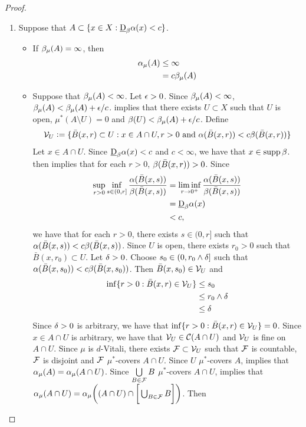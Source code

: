 \documentclass{book}
\begin{document}
	\begin{proof}\
		\begin{enumerate}
			\item Suppose that $A \subset \{x \in X: \underbar{D}_{\beta}\alpha(x) < c\}$. 
			\begin{itemize}
				\item If $\beta_{\mu}(A) = \infty$, then 
				\begin{align*}
					\alpha_{\mu}(A)
					&  \leq \infty \\
					& = c \beta_{\mu}(A)
				\end{align*}
				\item Suppose that $\beta_{\mu}(A) < \infty$. Let $\epsilon >0$. Since $\beta_{\mu}(A) < \infty$, $\beta_{\mu}(A) < \beta_{\mu}(A) + \epsilon/c$.  implies that there exists $U \subset X$ such that $U$ is open, $\mu^*(A \setminus U) = 0$ and $\beta(U) < \beta_{\mu}(A) + \epsilon/c$. Define 
				$$\mathcal{V}_{U} \vcentcolon= \{\bar{B}(x, r) \subset U: x \in A \cap U, r > 0 \text{ and } \alpha( \bar{B}(x, r)) < c \beta( \bar{B}(x, r))\}$$
				Let $x \in A \cap U$. Since $\underbar{D}_{\beta}\alpha(x) < c$ and $c < \infty$, we have that $x \in \operatorname{supp} \beta$.  then implies that for each $r > 0$, $\beta(\bar{B}(x, r)) > 0$. Since 
				\begin{align*}
					\sup\limits_{r>0} \inf_{s \in (0, r]} \frac{ \alpha(\bar{B}(x, s)) }{ \beta(\bar{B}(x, s)) }
					& = \liminf_{r \rightarrow 0^+} \frac{ \alpha(\bar{B}(x, s)) }{ \beta(\bar{B}(x, s)) } \\
					& = \underbar{D}_{\beta}\alpha(x) \\
					& < c, 
				\end{align*}
				we have that for each $r > 0$, there exists $s \in (0, r]$ such that $\alpha(\bar{B}(x, s)) < c \beta(\bar{B}(x, s))$. Since $U$ is open, there exists $r_0 > 0$ such that $\bar{B}(x, r_0) \subset U$. Let $\delta > 0$. Choose $s_0 \in (0, r_0 \wedge \delta]$ such that $\alpha(\bar{B}(x, s_0)) < c \beta(\bar{B}(x, s_0))$. Then $\bar{B}(x, s_0) \in \mathcal{V}_U$ and 
				\begin{align*}
					\inf \{r > 0: \bar{B}(x, r) \in \mathcal{V}_U\}
					& \leq s_0 \\
					& \leq r_0 \wedge \delta \\
					& \leq \delta
				\end{align*} 
				Since $\delta >0$ is arbitrary, we have that $\inf \{r > 0: \bar{B}(x, r) \in \mathcal{V}_U\} = 0$. Since $x \in A \cap U$ is arbitrary, we have that $\mathcal{V}_U \in \mathcal{C}(A \cap U)$ and $\mathcal{V}_U$ is fine on $A \cap U$. Since $\mu$ is $d$-Vitali, there exists $\mathcal{F} \subset \mathcal{V}_U$ such that $\mathcal{F}$ is countable, $\mathcal{F}$ is disjoint and $\mathcal{F}$ $\mu^*$-covers $A \cap U$. Since $U$ $\mu^*$-covers $A$,  implies that $\alpha_{\mu}(A) = \alpha_{\mu}(A \cap U)$. Since $\bigcup\limits_{B \in \mathcal{F}} B$ $\mu^*$-covers $A \cap U$,  implies that $\alpha_{\mu} (A \cap U) = \alpha_{\mu} \bigg((A \cap U) \cap \bigg[ \bigcup_{B \in \mathcal{F}} B \bigg] \bigg)$. Then

\end{itemize}
\end{enumerate}
\end{proof}
\end{document}

